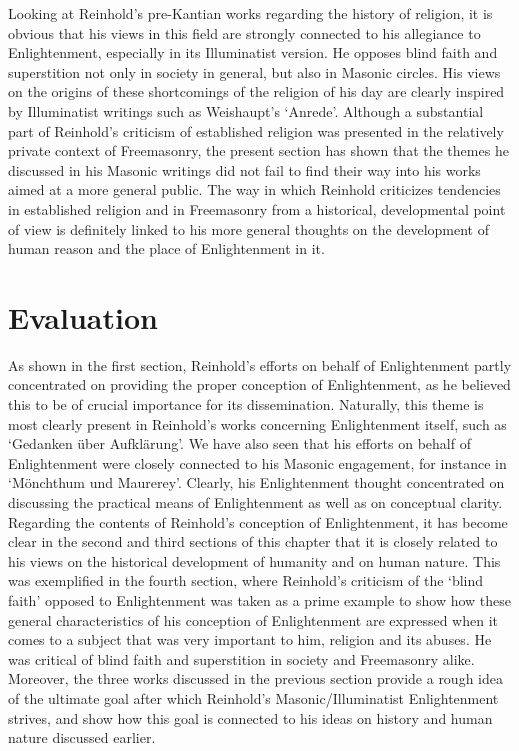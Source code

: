  Looking at Reinhold's pre{-}Kantian works regarding the history of religion, it is obvious that his views in this field are strongly connected to his allegiance to Enlightenment, especially in its Illuminatist version. He opposes blind faith and superstition not only in society in general, but also in Masonic circles. His views on the origins of these shortcomings of the religion of his day are clearly inspired by Illuminatist writings such as Weishaupt's `Anrede'. Although a substantial part of Reinhold's criticism of established religion was presented in the relatively private context of Freemasonry, the present section has shown that the themes he discussed in his Masonic writings did not fail to find their way into his works aimed at a more general public. The way in which Reinhold criticizes tendencies in established religion and in Freemasonry from a historical, developmental point of view is definitely linked to his more general thoughts on the development of human reason and the place of Enlightenment in it. 


\section{Evaluation }


As shown in the first section, Reinhold's efforts on behalf of Enlightenment partly concentrated on providing the proper conception of Enlightenment, as he believed this to be of crucial importance for its dissemination. Naturally, this theme is most clearly present in Reinhold's works concerning Enlightenment itself, such as `Gedanken \"{u}ber Aufkl\"{a}rung'. We have also seen that his efforts on behalf of Enlightenment were closely connected to his Masonic engagement, for instance in `M\"{o}nchthum und Maurerey'. Clearly, his Enlightenment thought concentrated on discussing the practical means of Enlightenment as well as on conceptual clarity. Regarding the contents of Reinhold's conception of Enlightenment, it has become clear in the second and third sections of this chapter that it is closely related to his views on the historical development of humanity and on human nature. This was exemplified in the fourth section, where Reinhold's criticism of the `blind faith' opposed to Enlightenment was taken as a prime example to show how these general characteristics of his conception of Enlightenment are expressed when it comes to a subject that was very important to him, religion and its abuses. He was critical of blind faith and superstition in society and Freemasonry alike. Moreover, the three works discussed in the previous section provide a rough idea of the ultimate goal after which Reinhold's Masonic/Illuminatist Enlightenment strives, and show how this goal is connected to his ideas on history and human nature discussed earlier.


